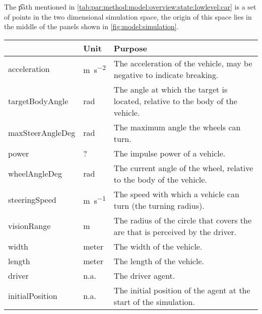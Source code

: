 The \t{path} mentioned in \cref{tab:par:method:model:overview:state:lowlevel:car} is a set of points in the two dimensional simulation space, the origin of this space lies in the middle of the panels shown in \cref{fig:model:simulation}. 


	\begin{table}
		\centering
		\begin{tabularx}{\textwidth}{>{\ttfamily}llX}
			\toprule
			\normalfont{Parameter}	&Unit & Purpose \\ 
			\midrule
			acceleration 			
				& \si{\meter\per\square\second} 
				& The acceleration of the vehicle, may be negative to indicate breaking.\\ 
			targetBodyAngle 		
				& \si{\radian}
				& The angle at which the target is located, relative to the body of the vehicle. \\ 
			maxSteerAngleDeg 		
				& \si{\radian}
				& The maximum angle the wheels can turn. \\ 
			power 					
				& \si{?}
				& The impulse power of a vehicle. \\ 
			wheelAngleDeg 			
				& \si{\radian}
				& The current angle of the wheel, relative to the body of the vehicle. \\ 
			steeringSpeed 			
				& \si{\meter\per\second}
				& The speed with which a vehicle can turn (the turning radius). \\ 
			visionRange 			
				& \si{\meter}
				& The radius of the circle that covers the are that is perceived by the driver.\\ 
			width 					
				& \si{meter} 
				& The width of the vehicle. \\ 
			length 					
				& \si{meter} 
				& The length of the vehicle. \\ 
			driver 					
				& n.a. 
				& The driver agent. \\ 
			initialPosition 		
				& n.a.
				& The initial position of the agent at the start of the simulation. \\ 

\end{tabularx}
\end{table}
